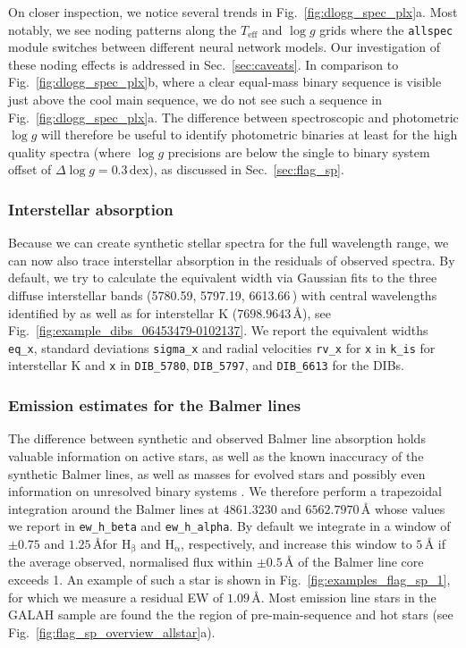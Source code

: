 \documentclass[
  journal=pasa,
  manuscript=research-paper, %
  year=2024,
  volume=37
]{cup-journal}
\newcommand{\Teff}{$T_\mathrm{eff}$\xspace}
\newcommand{\logg}{$\log g$\xspace}
\newcommand{\Angstroem}{\,\text{\AA}}	%
\begin{document}
On closer inspection, we notice several trends in Fig.~\ref{fig:dlogg_spec_plx}a. Most notably, we see noding patterns along the \Teff and \logg grids where the \texttt{allspec} module switches between different neural network models. Our investigation of these noding effects is addressed in Sec.~\ref{sec:caveats}. In comparison to Fig.~\ref{fig:dlogg_spec_plx}b, where a clear equal-mass binary sequence is visible just above the cool main sequence, we do not see such a sequence in Fig.~\ref{fig:dlogg_spec_plx}a. The difference between spectroscopic and photometric \logg will therefore be useful to identify photometric binaries at least for the high quality spectra (where \logg precisions are below the single to binary system offset of $\Delta \log g = 0.3\,\mathrm{dex}$), as discussed in Sec.~\ref{sec:flag_sp}.

\subsubsection{Interstellar absorption}

Because we can create synthetic stellar spectra for the full wavelength range, we can now also trace interstellar absorption in the residuals of observed spectra. By default, we try to calculate the equivalent width via Gaussian fits to the three diffuse interstellar bands (5780.59, 5797.19, 6613.66\Angstroem) with central wavelengths identified by \citet{Vogrincic2023} as well as for interstellar K ($7698.9643\,\text{\AA}$), see Fig.~\ref{fig:example_dibs_06453479-0102137}. We report the equivalent widths \texttt{eq\_x}, standard deviations \texttt{sigma\_x} and radial velocities \texttt{rv\_x} for \texttt{x} in \texttt{k\_is} for interstellar K and \texttt{x} in \texttt{DIB\_5780}, \texttt{DIB\_5797}, and \texttt{DIB\_6613} for the DIBs.

\subsubsection{Emission estimates for the Balmer lines}

The difference between synthetic and observed Balmer line absorption holds valuable information on active stars, as well as the known inaccuracy of the synthetic Balmer lines, as well as masses for evolved stars \citep{Bergemann2016} and possibly even information on unresolved binary systems \citep{Sayeed2024}. We therefore perform a trapezoidal integration around the Balmer lines at $4861.3230$ and $6562.7970\,\text{\AA}$ whose values we report in \texttt{ew\_h\_beta} and \texttt{ew\_h\_alpha}. By default we integrate in a window of $\pm 0.75$ and $1.25\,\text{\AA}$for $\text{H}_\upbeta$ and $\text{H}_\upalpha$, respectively, and increase this window to $5\,\text{\AA}$ if the average observed, normalised flux within $\pm 0.5\,\text{\AA}$ of the Balmer line core exceeds 1. An example of such a star is shown in Fig.~\ref{fig:examples_flag_sp_1}, for which we measure a residual EW of $1.09\,\text{\AA}$. Most emission line stars in the GALAH sample are found the the region of pre-main-sequence and hot stars (see Fig.~\ref{fig:flag_sp_overview_allstar}a).
\end{document}
